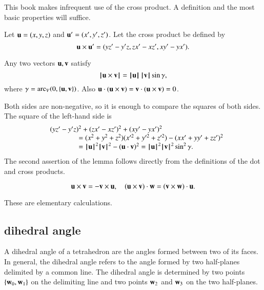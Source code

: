 This book makes infrequent use of the cross product.
A definition and the most basic properties will suffice.

\begin{definition}   Let $\u =(x,y,z)$ and $\u' = (x',y',z')$.  
Let the cross product be defined
by
    $$
    \u \times \u' = (y z' - y' z, z x' - x z', x y' - y x').
    $$
%
%
%
\end{definition}

\begin{lemma}  
Any two vectors $\u,\v$ satisfy
    $$\normo{\u \times \v} = \normo{\u}\,\normo{\v}\sin\gamma,$$
where $\gamma=\arc_V(0,\{\u,\v\})$.
Also $\u \cdot (\u\times \v) = \v\cdot (\u\times \v) = 0$.
\end{lemma}

\begin{proved}
   Both sides are non-negative, so it is enough to compare the
   squares of both sides.  The square of the left-hand side is
   $$
   \begin{array}{lll}
   &(y z'- y'z)^2 + (z x' - x z')^2 + (x y' - y x')^2 \\
    &\qquad\qquad=
   (x^2 + y^2 + z^2)(x'^2 + y'^2 + z'^2) - (x x' + y y' + z z')^2
   \\&\qquad\qquad= \normo{\u}^2\normo{\v}^2 - (\u\cdot \v)^2 = \normo{\u}^2\normo{\v}^2 \sin^2\gamma.
   \end{array}
   $$
The second assertion of the lemma follows directly from the definitions of the dot and cross products.
\swallowed\end{proved}


\begin{lemma}
    $$
    \u\times \v = -\v\times \u,\quad
    (\u\times \v)\cdot \w = (\v\times \w)\cdot \u.
    $$
\end{lemma}

\begin{proved}
These are elementary calculations.
\swallowed\end{proved}



\subsection{dihedral angle}

A dihedral angle of a tetrahedron are the angles formed between two of its faces. In general,
the dihedral angle refers to the angle formed by two half-planes
delimited by a common line.  The dihedral angle is determined
by two points $\{\w_0,\w_1\}$ on the delimiting line
and two points $\w_2$ and $\w_3$ on the two half-planes.
%
%
%
%
%

